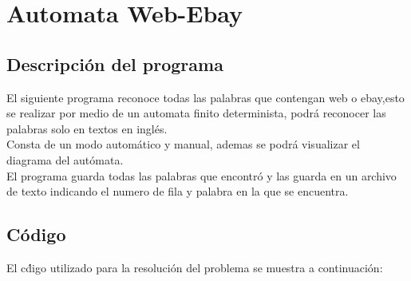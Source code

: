 \section{Automata Web-Ebay}
\subsection{ Descripci\'on del programa}
\justify
El siguiente programa reconoce todas las palabras que contengan web o ebay,esto se realizar por medio de un automata finito determinista, podr\'a reconocer las palabras solo en textos en ingl\'es.\\
Consta de un modo autom\'atico y manual, ademas se podr\'a visualizar el diagrama del aut\'omata.\\
El programa guarda todas las palabras que encontr\'o y las guarda en un archivo de texto indicando el numero de fila y palabra en la que se encuentra.\\
\subsection{C\'odigo}
El c\'digo utilizado para la resoluci\'on del problema se muestra a continuaci\'on:\\

